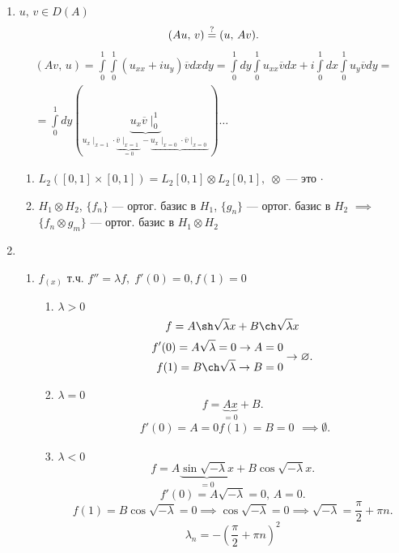 \documentclass[a4paper]{article}
\begin{document}
\begin{sol}
\begin{enumerate}
\item
	$u,\,v \in D(A)$ 
	\[
		\left( Au,\,v \right) \textover{=}{?} (u,\,Av)
	.\] 
\begin{multline*}
	\left( Av,\,u \right) = \int\limits_{0}^{1} \int\limits_{0}^{1}  (u_{x x} + i u_{y}) \overline{v} dx dy= \int\limits_{0}^{1} 
	dy \int\limits_{0}^{1} u_{x x} \overline{v}dx+i
	\int\limits_{0}^{1} dx \int\limits_{0}^{1}  u_y \overline{v} dy =\\= \int\limits_{0}^{1} dy \left( 
	\underbrace{u_x \overline{v}\mid _{0}^1}_{u_{x}\mid _{x=1}
\cdot \underbrace{\overline{v}\mid _{x=1}}_{=0}-\underbrace{u_x \mid _{x=0}\cdot \overline{v}\mid _{x=0}}_{}}\right)   
\ldots\end{multline*} 
\begin{enumerate}
	\item $L_2 \left( [0,1] \times [0,1] \right) =
		L_2 [0,1] \otimes L_2[0,1], \; \otimes$ --- это $\cdot$ 
	\item $H_1\otimes H_2$, $\{f_n\} $ --- ортог. базис в
		$H_1$, $\{g_n\} $ --- ортог. базис в $H_2$ 
		$\implies$ $\{f_n \otimes g_m\} $ --- ортог. базис в 
		$H_1 \otimes H_2$
\end{enumerate}
\item
\begin{enumerate}
	\item $f_(x)$ т.ч. $f'' =\lambda f,\; f'(0)=0, f(1)=0$
 \begin{enumerate}
	\item $\lambda> 0$ 
		\[
		f=
		A \sh \sqrt{\lambda} x +B \ch \sqrt{\lambda}  x
		\]
			\[
			\begin{aligned}
			f'(0) = A \sqrt{\lambda} =0 \to  A=0\\ f(1)= B \ch \sqrt{\lambda} \to B=0
			\end{aligned} \to \emptyset
		.\] 
	\item  $\lambda=0$
		 \[
		f=\underbrace{Ax}_{=0}+B
		.\]
		\[
			\begin{aligned}
			f'(0)=A=0
			f(1)=B=0	
			\end{aligned}\implies \emptyset
		.\] 
	\item $\lambda<0$ 
		\[
		f= A \underbrace{\sin \sqrt{-\lambda} x}_{=0}+
		B \cos \sqrt{-\lambda} x
		.\] 
		\[
			f'(0) = A \sqrt{ -\lambda} =0,\, A=0
		.\] 
		\[
			f(1)=B \cos \sqrt{-\lambda} =0 \implies
			\cos \sqrt{-\lambda} =0 \implies
			\sqrt{-\lambda} = \frac{\pi}{2} +\pi n
		.\] 
		\[
			\lambda_n = -\left( \frac{\pi}{2}+\pi n \right) ^2
\]
\end{enumerate}
\end{enumerate}
\end{enumerate}
\end{sol}
\end{document}
